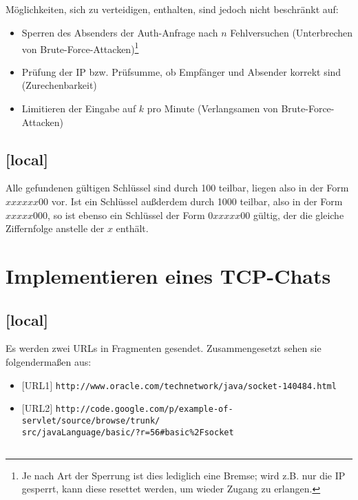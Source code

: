 \documentclass[twoside]{article}
\begin{document}
\subsection{}
Möglichkeiten, sich zu verteidigen, enthalten, sind jedoch nicht beschränkt auf:
\begin{itemize}
	\item Sperren des Absenders der Auth-Anfrage nach $n$ Fehlversuchen (Unterbrechen von Brute-Force-Attacken)\footnote{Je nach Art der Sperrung ist dies lediglich eine Bremse; wird z.B. nur die IP gesperrt, kann diese resettet werden, um wieder Zugang zu erlangen.}
	\item Prüfung der IP bzw. Prüfsumme, ob Empfänger und Absender korrekt sind (Zurechenbarkeit)
	\item Limitieren der Eingabe auf $k$ pro Minute (Verlangsamen von Brute-Force-Attacken)
\end{itemize}
\subsection{[local]}
Alle gefundenen gültigen Schlüssel sind durch 100 teilbar, liegen also in der Form $xxxxxx00$ vor.
Ist ein Schlüssel außderdem durch 1000 teilbar, also in der Form $xxxxx000$, so ist ebenso ein Schlüssel der Form $0xxxxx00$ gültig, der die gleiche Ziffernfolge anstelle der $x$ enthält.


\section{Implementieren eines TCP-Chats}
\subsection{[local]}
Es werden zwei URLs in Fragmenten gesendet.
Zusammengesetzt sehen sie folgendermaßen aus:
\begin{itemize}
	\item $[$URL1$]$ \texttt{http://www.oracle.com/technetwork/java/socket-140484.html}
	\item $[$URL2$]$ \texttt{http://code.google.com/p/example-of-servlet/source/browse/trunk/}\\\texttt{src/javaLanguage/basic/?r=56\#basic\%2Fsocket}
\end{itemize}
\subsection{}
\subsection{}
\subsection{}
\subsection{}
\end{document}
